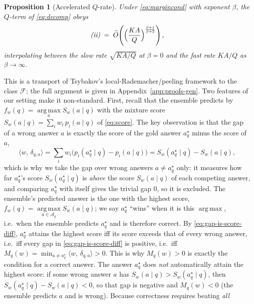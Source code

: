\documentclass{article} %
\newtheorem{proposition}[theorem]{Proposition}
\providecommand{\argmax}{\mathop{\mathrm{arg\,max}}\limits}
\providecommand{\Aq}{\mathcal{A}_q}
\providecommand{\ip}[2]{\langle #1,\, #2\rangle}
\providecommand{\Fcal}{\mathcal{F}}
\providecommand{\Too}{\widetilde{O}}
\begin{document}
\begin{proposition}[Accelerated $Q$-rate]
\label{prop:1}
Under \eqref{eq:margincond} with exponent $\beta$, the $Q$-term of
\eqref{eq:decomp} obeys
\begin{equation}
\label{eq:qrate}
\text{\emph{(ii)}} \;=\; \Too\!\left(\Big(\frac{KA}{Q}\Big)^{\frac{\beta+1}{\beta+2}}\right),
\end{equation}
interpolating between the slow rate $\sqrt{KA/Q}$ at $\beta=0$ and the fast rate
$KA/Q$ as $\beta\to\infty$.
\end{proposition}

\noindent This is a transport of Tsybakov's local-Rademacher/peeling framework
\citep{bartlett2005local,koltchinskii2006local,massart2006risk} to the class
$\Fcal$; the full argument is given in Appendix~\ref{app:proofs-gen}. Two
features of our setting make it non-standard.
First, recall that the ensemble predicts by $f_w(q)=\argmax_a S_w(a\mid q)$ with
the mixture score $S_w(a\mid q)=\sum_i w_i\,p_i(a\mid q)$ of
\eqref{eq:score}. The key observation is that the gap of a wrong answer $a$
is exactly the score of the gold answer $a_q^\star$ minus the score of $a$,
\begin{equation}
\label{eq:gap-is-score-diff}
\ip{w}{\delta_{q,a}}
= \sum_i w_i\big(p_i(a_q^\star\mid q)-p_i(a\mid q)\big)
= S_w(a_q^\star\mid q) - S_w(a\mid q),
\end{equation}
which is why we take the gap over wrong answers $a\ne a_q^\star$ only: it measures
how far $a_q^\star$'s score $S_w(a_q^\star\mid q)$ is \emph{above} the score
$S_w(a\mid q)$ of each competing answer, and comparing $a_q^\star$ with itself
gives the trivial gap $0$, so it is excluded. The ensemble's predicted answer is
the one with the highest score, $f_w(q)=\argmax_{a\in\Aq} S_w(a\mid q)$; we say
$a_q^\star$ ``wins'' when it is this $\argmax$, i.e.\ when the ensemble predicts
$a_q^\star$ and is therefore correct. By \eqref{eq:gap-is-score-diff}, $a_q^\star$
attains the highest score iff its score exceeds that of every wrong answer, i.e.\
iff every gap in \eqref{eq:gap-is-score-diff} is positive, i.e.\ iff
$M_q(w)=\min_{a\ne a_q^\star}\ip{w}{\delta_{q,a}}>0$. This is why $M_q(w)>0$ is
exactly the condition for a correct answer. The answer $a_q^\star$ does \emph{not}
automatically attain the highest score: if some wrong answer $a$ has
$S_w(a\mid q)>S_w(a_q^\star\mid q)$, then
$S_w(a_q^\star\mid q)-S_w(a\mid q)<0$, so that gap is negative and $M_q(w)<0$
(the ensemble predicts $a$ and is wrong). Because correctness requires beating \emph{all}
\end{document}

